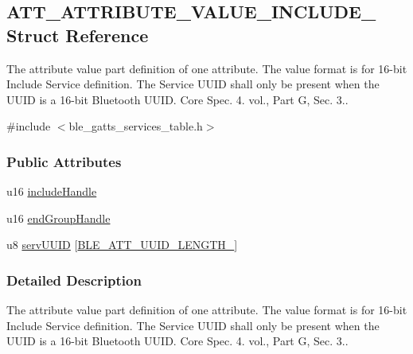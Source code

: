 \hypertarget{struct_a_t_t___a_t_t_r_i_b_u_t_e___v_a_l_u_e___i_n_c_l_u_d_e__2}{}\subsection{A\+T\+T\+\_\+\+A\+T\+T\+R\+I\+B\+U\+T\+E\+\_\+\+V\+A\+L\+U\+E\+\_\+\+I\+N\+C\+L\+U\+D\+E\+\_ Struct Reference}
\label{struct_a_t_t___a_t_t_r_i_b_u_t_e___v_a_l_u_e___i_n_c_l_u_d_e__2}


The attribute value part definition of one attribute. The value format is for 16-\/bit Include Service definition. The Service U\+U\+ID shall only be present when the U\+U\+ID is a 16-\/bit Bluetooth U\+U\+ID. Core Spec. 4. vol., Part G, Sec. 3..  




{\ttfamily \#include $<$ble\+\_\+gatts\+\_\+services\+\_\+table.\+h$>$}

\subsubsection*{Public Attributes}
\begin{DoxyCompactItemize}
\item 
u16 \hyperlink{struct_a_t_t___a_t_t_r_i_b_u_t_e___v_a_l_u_e___i_n_c_l_u_d_e__2_a7d12428c197e84e937e37bfe9b7adcd6}{include\+Handle}
\item 
u16 \hyperlink{struct_a_t_t___a_t_t_r_i_b_u_t_e___v_a_l_u_e___i_n_c_l_u_d_e__2_a4cb4bf67b1a1fe08beaeed8aeb90fa08}{end\+Group\+Handle}
\item 
u8 \hyperlink{struct_a_t_t___a_t_t_r_i_b_u_t_e___v_a_l_u_e___i_n_c_l_u_d_e__2_ad29d72d3f2e52b70f05a378ff68b2a3b}{serv\+U\+U\+ID} \mbox{[}\hyperlink{group___b_l_e___a_t_t___u_u_i_d___l_e_n_g_t_h___t_y_p_e_s_gad9197bbabd94416a4a41891fb808dcf1}{B\+L\+E\+\_\+\+A\+T\+T\+\_\+\+U\+U\+I\+D\+\_\+\+L\+E\+N\+G\+T\+H\+\_}\mbox{]}
\end{DoxyCompactItemize}


\subsubsection{Detailed Description}
The attribute value part definition of one attribute. The value format is for 16-\/bit Include Service definition. The Service U\+U\+ID shall only be present when the U\+U\+ID is a 16-\/bit Bluetooth U\+U\+ID. Core Spec. 4. vol., Part G, Sec. 3.. 

